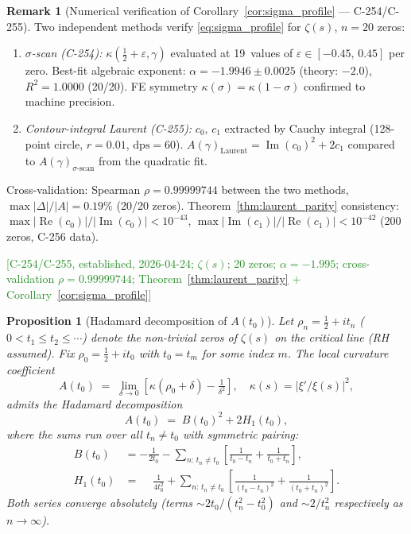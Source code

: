 \documentclass[11pt, a4paper]{article}
\theoremstyle{definition}
\newtheorem{remark}{Remark}[section]
\theoremstyle{plain}
\newtheorem{proposition}[theorem]{Proposition}
\begin{document}
\begin{remark}[Numerical verification of Corollary~\ref{cor:sigma_profile} --- C-254/C-255]
\label{rem:sigma_profile_numerical}
Two independent methods verify \eqref{eq:sigma_profile} for $\zeta(s)$, $n = 20$ zeros:
\begin{enumerate}
  \item \emph{$\sigma$-scan (C-254):}\; $\kappa(\tfrac12{+}\varepsilon, \gamma)$ evaluated at
    19~values of $\varepsilon \in [-0.45,\, 0.45]$ per zero.
    Best-fit algebraic exponent: $\alpha = -1.9946 \pm 0.0025$
    (theory: $-2.0$), $R^2 = 1.0000$ (20/20).
    FE symmetry $\kappa(\sigma) = \kappa(1{-}\sigma)$ confirmed to machine precision.
  \item \emph{Contour-integral Laurent (C-255):}\; $c_0,\, c_1$ extracted by Cauchy integral
    (128-point circle, $r = 0.01$, $\mathrm{dps} = 60$).
    $A(\gamma)_{\text{Laurent}} = \operatorname{Im}(c_0)^2 + 2c_1$ compared to
    $A(\gamma)_{\sigma\text{-scan}}$ from the quadratic fit.
\end{enumerate}
Cross-validation: Spearman $\rho = 0.99999744$ between the two methods,
$\max|\Delta|/|A| = 0.19\%$ (20/20 zeros).
Theorem~\ref{thm:laurent_parity} consistency: $\max|\operatorname{Re}(c_0)|/|\operatorname{Im}(c_0)| < 10^{-43}$,
$\max|\operatorname{Im}(c_1)|/|\operatorname{Re}(c_1)| < 10^{-42}$ (200 zeros, C-256 data).

\textcolor{ForestGreen}{[C-254/C-255, established, 2026-04-24; $\zeta(s)$; 20 zeros; $\alpha{=}{-}1.995$; cross-validation $\rho{=}0.99999744$; Theorem~\ref{thm:laurent_parity} + Corollary~\ref{cor:sigma_profile}]}
\end{remark}

\begin{proposition}[Hadamard decomposition of $A(t_0)$]
\label{prop:hadamard_A_decomp}
Let $\rho_n = \tfrac{1}{2} + i t_n$ ($0 < t_1 \le t_2 \le \cdots$) denote the
non-trivial zeros of $\zeta(s)$ on the critical line (RH assumed).
Fix $\rho_0 = \tfrac{1}{2} + i t_0$ with $t_0 = t_m$ for some index $m$.
The local curvature coefficient
\[
  A(t_0) \;=\; \lim_{\delta\to 0}\!\left[\kappa(\rho_0{+}\delta) - \tfrac{1}{\delta^2}\right],
  \quad \kappa(s) = |\xi'/\xi(s)|^2,
\]
admits the \emph{Hadamard decomposition}
\[
  A(t_0) \;=\; B(t_0)^2 + 2H_1(t_0),
\]
where the sums run over all $t_n \neq t_0$ with symmetric pairing:
\begin{align*}
  B(t_0)  &= -\frac{1}{2t_0}
              - \sum_{n:\,t_n \neq t_0}
                \!\left[\frac{1}{t_0-t_n} + \frac{1}{t_0+t_n}\right], \\
  H_1(t_0)&= \phantom{-}\frac{1}{4t_0^2}
              + \sum_{n:\,t_n \neq t_0}
                \!\left[\frac{1}{(t_0-t_n)^2} + \frac{1}{(t_0+t_n)^2}\right].
\end{align*}
Both series converge absolutely (terms $\sim 2t_0/(t_n^2 - t_0^2)$ and
$\sim 2/t_n^2$ respectively as $n \to \infty$).
\end{proposition}
\end{document}
